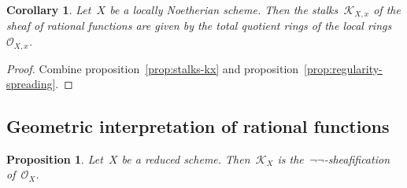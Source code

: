 \documentclass[10pt]{amsart}
\theoremstyle{definition}
\theoremstyle{plain}
\newtheorem{prop}[defn]{Proposition}
\newtheorem{cor}[defn]{Corollary}
\theoremstyle{remark}
\renewcommand{\O}{\mathcal{O}}
\newcommand{\K}{\mathcal{K}}
\newcommand{\?}{\,{:}\,}
\renewcommand{\_}{\mathpunct{.}\,}
\begin{document}
\begin{cor}Let~$X$ be a locally Noetherian scheme. Then the stalks~$\K_{X,x}$
of the sheaf of rational functions are given by the total quotient rings of the
local rings~$\O_{X,x}$.\end{cor}
\begin{proof}Combine proposition~\ref{prop:stalks-kx} and
proposition~\ref{prop:regularity-spreading}.\end{proof}


\subsection{Geometric interpretation of rational functions}

\begin{prop}Let~$X$ be a reduced scheme. Then~$\K_X$ is
the~$\neg\neg$-sheafification of~$\O_X$.\end{prop}
\end{document}
